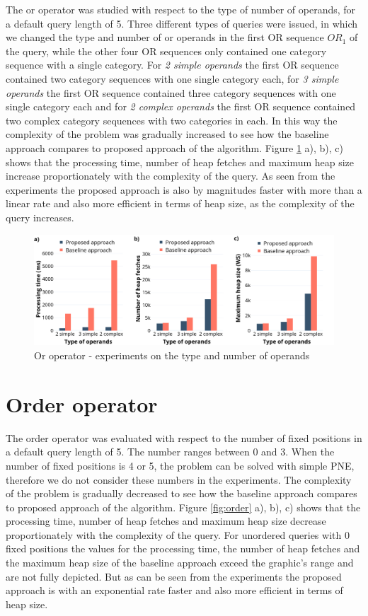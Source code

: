 The or operator was studied with respect to the type of number of operands, for a default query length of 5. Three different types of queries were issued, in which we changed the type and number of or operands in the first OR sequence $OR_1$ of the query, while the other four OR sequences only contained one category sequence with a single category. For \textit{2 simple operands} the first OR sequence contained two category sequences with one single category each, for \textit{3 simple operands} the first OR sequence contained three category sequences with one single category each and for \textit{2 complex operands} the first OR sequence contained two complex category sequences with two categories in each. In this way the complexity of the problem was gradually increased to see how the baseline approach compares to proposed approach of the algorithm.  
Figure \ref{fig:or} a), b), c) shows that the processing time, number of heap fetches and maximum heap size increase proportionately with the complexity of the query. As seen from the experiments the proposed approach is also by magnitudes faster with more than a linear rate and also more efficient in terms of heap size, as the complexity of the query increases. 

\begin{figure}[H]
	\includegraphics[scale=0.29]{images/or.png}
	\centering
	\caption{Or operator - experiments on the type and number of operands}
	\label{fig:or}
\end{figure}


\section{Order operator}
\label{sec:experimentsOrder}

The order operator was evaluated with respect to the number of fixed positions in a default query length of 5. The number ranges between 0 and 3. When the number of fixed positions is 4 or 5, the problem can be solved with simple PNE, therefore we do not consider these numbers in the experiments. The complexity of the problem is gradually decreased to see how the baseline approach compares to proposed approach of the algorithm.  
Figure \ref{fig:order} a), b), c) shows that the processing time, number of heap fetches and maximum heap size decrease proportionately with the complexity of the query. For unordered queries with 0 fixed positions the values for the processing time, the number of heap fetches and the maximum heap size of the baseline approach exceed the graphic's range and are not fully depicted. But as can be seen from the experiments the proposed approach is with an exponential rate faster and also more efficient in terms of heap size. \newline

